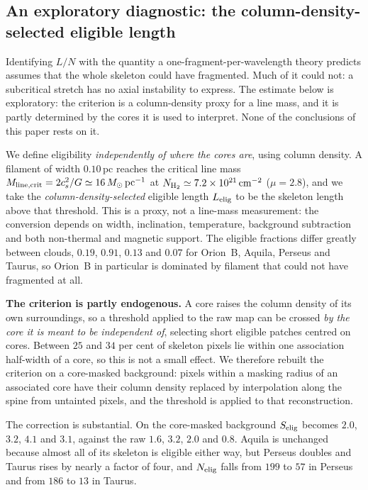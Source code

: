 \documentclass[usenatbib,twoside,twocolumn]{mnras}
\begin{document}
\subsection{An exploratory diagnostic: the column-density-selected eligible length}
\label{sec:eligible}

Identifying $L/N$ with the quantity a one-fragment-per-wavelength theory predicts assumes that the whole skeleton could have fragmented. Much of it could not: a subcritical stretch has no axial instability to express. The estimate below is exploratory: the criterion is a column-density proxy for a line mass, and it is partly determined by the cores it is used to interpret. None of the conclusions of this paper rests on it.

We define eligibility \emph{independently of where the cores are}, using column density. A filament of width $0.10$\,pc reaches the critical line mass $M_{\rm line,crit}=2c_s^2/G\simeq16\,M_\odot\,{\rm pc^{-1}}$ at $N_{\rm H_2}\simeq7.2\times10^{21}\,{\rm cm^{-2}}$ ($\mu=2.8$), and we take the \emph{column-density-selected} eligible length $L_{\rm elig}$ to be the skeleton length above that threshold. This is a proxy, not a line-mass measurement: the conversion depends on width, inclination, temperature, background subtraction and both non-thermal and magnetic support. The eligible fractions differ greatly between clouds, $0.19$, $0.91$, $0.13$ and $0.07$ for Orion~B, Aquila, Perseus and Taurus, so Orion~B in particular is dominated by filament that could not have fragmented at all.

\smallskip\noindent\textbf{The criterion is partly endogenous.} A core raises the column density of its own surroundings, so a threshold applied to the raw map can be crossed \emph{by the core it is meant to be independent of}, selecting short eligible patches centred on cores. Between $25$ and $34$ per cent of skeleton pixels lie within one association half-width of a core, so this is not a small effect. We therefore rebuilt the criterion on a core-masked background: pixels within a masking radius of an associated core have their column density replaced by interpolation along the spine from untainted pixels, and the threshold is applied to that reconstruction.

The correction is substantial. On the core-masked background $S_{\rm elig}$ becomes $2.0$, $3.2$, $4.1$ and $3.1$, against the raw $1.6$, $3.2$, $2.0$ and $0.8$. Aquila is unchanged because almost all of its skeleton is eligible either way, but Perseus doubles and Taurus rises by nearly a factor of four, and $N_{\rm elig}$ falls from $199$ to $57$ in Perseus and from $186$ to $13$ in Taurus.
\end{document}
